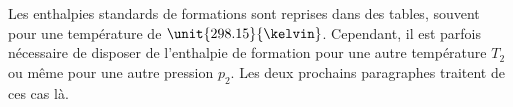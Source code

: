 %
%
%
%
%
%
%
%
%
%
%

Les enthalpies standards de formations sont reprises dans des tables,
souvent pour une température de $\unit{298.15}{\kelvin}$. Cependant,
il est parfois nécessaire de disposer de l'enthalpie de formation
pour une autre température $T_2$ ou même pour une autre pression $p_2$.
Les deux prochains paragraphes traitent de ces cas là.

